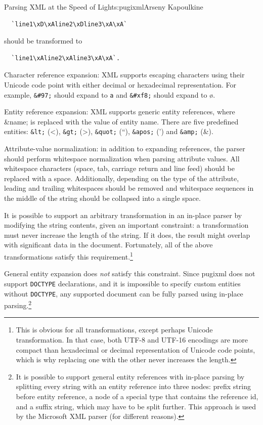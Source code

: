 \begin{aosachapter}{Parsing XML at the Speed of Light}{s:pugixml}{Arseny Kapoulkine}
\begin{aosaitemize}
\begin{verbatim}
  `line1\xD\xAline2\xDline3\xA\xA`
\end{verbatim}

  should be transformed to

\begin{verbatim}
  `line1\xAline2\xAline3\xA\xA`.
\end{verbatim}
\item
  Character reference expansion: XML supports escaping characters using
  their Unicode code point with either decimal or hexadecimal
  representation. For example, \texttt{\&\#97;} should expand to
  \texttt{a} and \texttt{\&\#xf8;} should expand to ø.
\item
  Entity reference expansion: XML supports generic entity references,
  where \&name; is replaced with the value of entity name. There are
  five predefined entities: \texttt{\&lt;} (\textless{}), \texttt{\&gt;}
  (\textgreater{}), \texttt{\&quot;} (``), \texttt{\&apos;} (') and
  \texttt{\&amp;} (\&).
\item
  Attribute-value normalization: in addition to expanding references,
  the parser should perform whitespace normalization when parsing
  attribute values. All whitespace characters (space, tab, carriage
  return and line feed) should be replaced with a space. Additionally,
  depending on the type of the attribute, leading and trailing
  whitespaces should be removed and whitespace sequences in the middle
  of the string should be collapsed into a single space.
\end{aosaitemize}

It is possible to support an arbitrary transformation in an in-place
parser by modifying the string contents, given an important constraint:
a transformation must never increase the length of the string. If it
does, the result might overlap with significant data in the document.
Fortunately, all of the above transformations satisfy this
requirement.\footnote{This is obvious for all transformations, except
  perhaps Unicode transformation. In that case, both UTF-8 and UTF-16
  encodings are more compact than hexadecimal or decimal representation
  of Unicode code points, which is why replacing one with the other
  never increases the length.}

General entity expansion does \emph{not} satisfy this constraint. Since
pugixml does not support \texttt{DOCTYPE} declarations, and it is
impossible to specify custom entities without \texttt{DOCTYPE}, any
supported document can be fully parsed using in-place parsing.\footnote{It
  is possible to support general entity references with in-place parsing
  by splitting every string with an entity reference into three nodes:
  prefix string before entity reference, a node of a special type that
  contains the reference id, and a suffix string, which may have to be
  split further. This approach is used by the Microsoft XML parser (for
  different reasons).}


\end{aosachapter}
